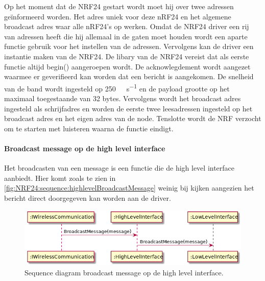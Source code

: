 \documentclass[a4paper, 11pt, oneside]{report}
\begin{document}
Op het moment dat de NRF24 gestart wordt moet hij over twee adressen geïnformeerd worden.
Het adres uniek voor deze nRF24 en het algemene broadcast adres waar alle nRF24's op werken.
Omdat de NRF24 driver een rij van adressen heeft die hij allemaal in de gaten moet houden wordt een aparte functie gebruik voor het instellen van de adressen.
Vervolgens kan de driver een instantie maken van de NRF24.
De libary van de NRF24 vereist dat als eerste functie altijd begin() aangeroepen wordt.
De acknowlegdement wordt aangezet waarmee er geverifieerd kan worden dat een bericht is aangekomen.
De snelheid van de band wordt ingesteld op \SI{250}{\kilo\bit\per\second}  en de payload grootte op het maximaal toegestaande van 32 bytes.
Vervolgens wordt het broadcast adres ingesteld als schrijfadres en worden de eerste twee leesadressen ingesteld op het broadcast adres en het eigen adres van de node.
Tenslotte wordt de NRF verzocht om te starten met luisteren waarna de functie eindigt.

\paragraph{Broadcast message op de high level interface}
\label{DetailedDesign:NRF24:sequence:highlevelBroadcastMessage}
Het broadcasten van een message is een functie die de high level interface aanbiedt.
Hier komt zoals te zien in \autoref{fig:NRF24:sequence:highlevelBroadcastMessage} weinig bij kijken aangezien het bericht direct doorgegeven kan worden aan de driver.
\begin{figure}[H]
	\begin{center}\includegraphics[width=.7\linewidth]{UML/out/NRF24/sequence/highlevelBroadcastMessage/highlevelBroadcastMessage.png}\end{center}
	\caption{Sequence diagram broadcast message op de high level interface.}
	\label{fig:NRF24:sequence:highlevelBroadcastMessage}
\end{figure}
\end{document}
